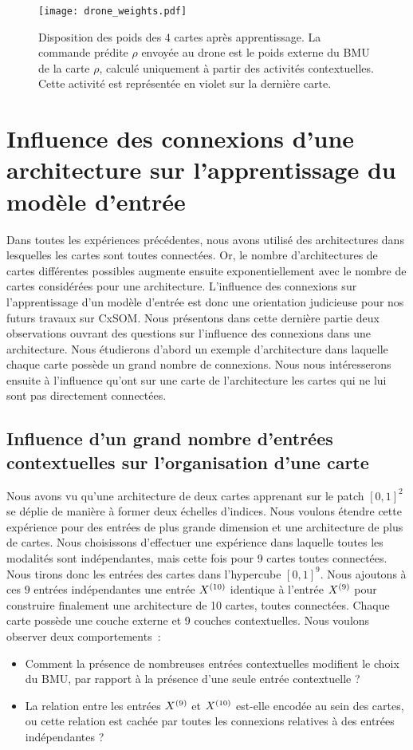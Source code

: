 \documentclass[../main]{subfiles}
\begin{document}
\begin{figure}
\texttt{[image: drone\_weights.pdf]}
\caption{Disposition des poids des 4 cartes après apprentissage. La commande prédite $\rho$ envoyée au drone est le poids externe du BMU de la carte $\rho$, calculé uniquement à partir des activités contextuelles. Cette activité est représentée en violet sur la dernière carte.}
\label{fig:drone_w}
\end{figure}

\section{Influence des connexions d'une architecture sur l'apprentissage du modèle d'entrée}

Dans toutes les expériences précédentes, nous avons utilisé des architectures dans lesquelles les cartes sont toutes connectées. Or, le nombre d'architectures de cartes différentes possibles augmente ensuite exponentiellement avec le nombre de cartes considérées pour une architecture.
L'influence des connexions sur l'apprentissage d'un modèle d'entrée est donc une orientation judicieuse pour nos futurs travaux sur CxSOM. 
Nous présentons dans cette dernière partie deux observations ouvrant des questions sur l'influence des connexions dans une architecture.
Nous étudierons d'abord un exemple d'architecture dans laquelle chaque carte possède un grand nombre de connexions.
Nous nous intéresserons ensuite à l'influence qu'ont sur une carte de l'architecture les cartes qui ne lui sont pas directement connectées.

\subsection{Influence d'un grand nombre d'entrées contextuelles sur l'organisation d'une carte}

Nous avons vu qu'une architecture de deux cartes apprenant sur le patch $[0,1]^2$ se déplie de manière à former deux échelles d'indices. 
Nous voulons étendre cette expérience pour des entrées de plus grande dimension et une architecture de plus de cartes. 
Nous choisissons d'effectuer une expérience dans laquelle toutes les modalités sont indépendantes, mais cette fois pour 9 cartes toutes connectées.
Nous tirons donc les entrées des cartes dans l'hypercube $[0,1]^9$. 
Nous ajoutons à ces $9$ entrées indépendantes une entrée $X^{({10})}$ identique à l'entrée $X^{({9})}$ pour construire finalement une architecture de 10 cartes, toutes connectées. Chaque carte possède une couche externe et 9 couches contextuelles.
Nous voulons observer deux comportements~: 
\begin{itemize}
	\item Comment la présence de nombreuses entrées contextuelles modifient le choix du BMU, par rapport à la présence d'une seule entrée contextuelle ? 
	\item La relation entre les entrées $X^{({9})}$ et $X^{({10})}$ est-elle encodée au sein des cartes, ou cette relation est cachée par toutes les connexions relatives à des entrées indépendantes ? 
\end{itemize}
\end{document}
